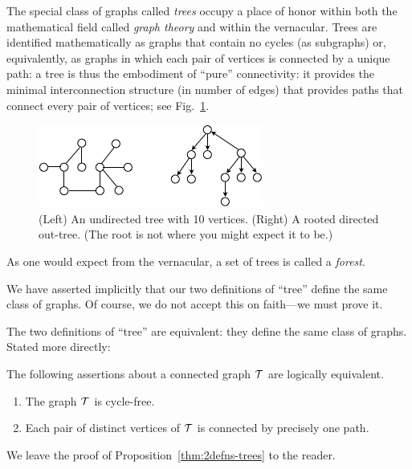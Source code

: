    

The special class of graphs called {\it trees} occupy a place of honor within both the mathematical field called {\it graph theory} and within the vernacular.  Trees are identified mathematically as graphs that contain no cycles (as subgraphs) or, equivalently, as graphs in which each pair of vertices is connected by a unique path: a tree is thus the embodiment of ``pure'' connectivity:  it provides the minimal interconnection structure (in number of edges) that provides paths that connect every pair of vertices; see Fig.~\ref{fig:tree}.
\begin{figure}[hbt]
\begin{center}
       \includegraphics[scale=0.6]{FiguresGraph/tree}
       \caption{(Left) An undirected tree with 10 vertices.  (Right) A rooted directed out-tree.  (The root is not where you might expect it to be.)}
  \label{fig:tree}
\end{center}
\end{figure}
As one would expect from the vernacular, a set of trees is called a {\it forest}. 

\medskip

We have asserted implicitly that our two definitions of ``tree'' define the same class of graphs.  Of course, we do not accept this on faith---we must prove it.

\begin{prop}
\label{thm:2defns-trees}
The two definitions of ``tree'' are equivalent: they define the same class of graphs.  Stated more directly:

\smallskip

\noindent
The following assertions about a connected graph $\mbox{$\cal T$}$ are  logically equivalent. 
\begin{enumerate}
\item
The graph $\mbox{$\cal T$}$ is cycle-free.
\medskip\item
Each pair of distinct vertices of $\mbox{$\cal T$}$ is connected by precisely one path.
\end{enumerate}
\end{prop}

We leave the proof of Proposition~\ref{thm:2defns-trees} to the reader.

